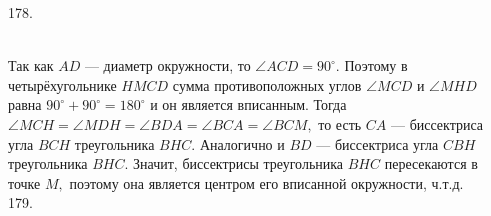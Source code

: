 \documentclass[12pt]{article}
\begin{document}
178. \begin{figure}[ht!]
\end{figure}\\
Так как $AD$ --- диаметр окружности, то $ \angle ACD = 90^\circ.$ Поэтому в четырёхугольнике $HMCD$ сумма противоположных углов $\angle MCD$ и $\angle MHD$ равна $90^\circ+90^\circ=180^\circ$ и он является вписанным. Тогда $\angle MCH = \angle MDH = \angle BDA =  \angle BCA =  \angle BCM,$
то есть $CA$ --- биссектриса угла $BCH$ треугольника $BHC.$
Аналогично и $BD$ --- биссектриса угла $CBH$ треугольника $BHC.$ Значит, биссектрисы треугольника $BHC$ пересекаются в точке $M,$ поэтому она является центром его вписанной окружности, ч.т.д.\\
179. \begin{figure}[ht!]
\end{figure}\\
\end{document}
